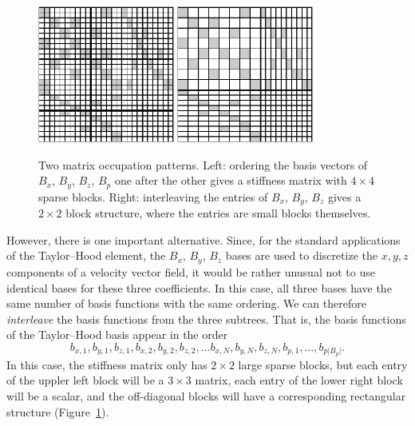 \documentclass[a4paper,10pt,headings=normal,bibliography=totoc]{scrartcl}
\newcommand{\abs}[1]{{\lvert#1\rvert}}
\begin{document}
\begin{figure}
 \begin{center}
   \includegraphics[width=0.4\textwidth]{taylor-hood-matrix-lexicographic}
   \qquad
   \includegraphics[width=0.4\textwidth]{taylor-hood-matrix-interleaved}
 \end{center}
 \caption{Two matrix occupation patterns.  Left: ordering the basis vectors of $B_x$, $B_y$, $B_z$, $B_p$
   one after the other gives a stiffness matrix with $4 \times 4$ sparse blocks.
   Right: interleaving the entries of $B_x$, $B_y$, $B_z$ gives a $2 \times 2$ block structure, where
   the entries are small blocks themselves.
   }
 \label{fig:dune_functions:matrix_occupation_patterns}
\end{figure}

However, there is one important alternative.  Since, for the standard applications of the Taylor--Hood element,
the $B_x$, $B_y$, $B_z$ bases are used to discretize the $x, y, z$ components of a velocity vector field,
it would be rather unusual not to use identical bases for these three coefficients.
In this case, all three bases have the same number of basis functions with the same ordering.  We can therefore
{\em interleave} the basis functions from the three subtrees.  That is,
the basis functions of the Taylor--Hood basis appear in the order
\begin{equation*}
 b_{x,1}, b_{y,1}, b_{z,1},
 b_{x,2}, b_{y,2}, b_{z,2},
 \dots
 b_{x,N}, b_{y,N}, b_{z,N},
 b_{p,1}, \dots, b_{p\abs{B_p}}.
\end{equation*}
In this case, the stiffness matrix only has $2 \times 2$ large sparse blocks, but each entry of the uppler left
block will be a $3 \times 3$ matrix, each entry of the lower right block will be a scalar, and the off-diagonal
blocks will have a corresponding rectangular structure (Figure~\ref{fig:dune_functions:matrix_occupation_patterns}).
\end{document}
